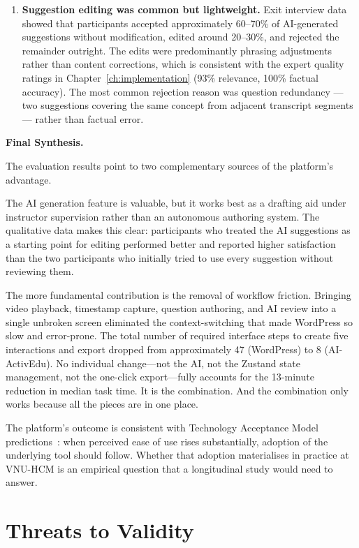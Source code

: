 \begin{enumerate}
    \item \textbf{Suggestion editing was common but lightweight.} Exit interview data showed that participants accepted approximately 60--70\% of AI-generated suggestions without modification, edited around 20--30\%, and rejected the remainder outright. The edits were predominantly phrasing adjustments rather than content corrections, which is consistent with the expert quality ratings in Chapter~\ref{ch:implementation} (93\% relevance, 100\% factual accuracy). The most common rejection reason was question redundancy --- two suggestions covering the same concept from adjacent transcript segments --- rather than factual error.
\end{enumerate}

\textbf{Final Synthesis.}

The evaluation results point to two complementary sources of the platform's advantage.

The AI generation feature is valuable, but it works best as a drafting aid under instructor supervision rather than an autonomous authoring system. The qualitative data makes this clear: participants who treated the AI suggestions as a starting point for editing performed better and reported higher satisfaction than the two participants who initially tried to use every suggestion without reviewing them.

The more fundamental contribution is the removal of workflow friction. Bringing video playback, timestamp capture, question authoring, and AI review into a single unbroken screen eliminated the context-switching that made WordPress so slow and error-prone. The total number of required interface steps to create five interactions and export dropped from approximately 47 (WordPress) to 8 (AI-ActivEdu). No individual change---not the AI, not the Zustand state management, not the one-click export---fully accounts for the 13-minute reduction in median task time. It is the combination. And the combination only works because all the pieces are in one place.

The platform's outcome is consistent with Technology Acceptance Model predictions~\cite{davis1989}: when perceived ease of use rises substantially, adoption of the underlying tool should follow. Whether that adoption materialises in practice at VNU-HCM is an empirical question that a longitudinal study would need to answer.

\section{Threats to Validity}

